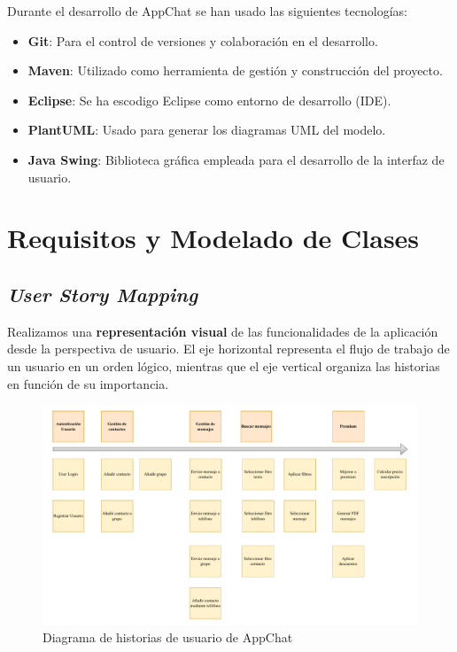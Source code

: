 \documentclass[11pt]{article}
\begin{document}
Durante el desarrollo de AppChat se han usado las siguientes tecnologías:

\begin{itemize}
	\item \textbf{Git}: Para el control de versiones y colaboración en el desarrollo.
	\item \textbf{Maven}: Utilizado como herramienta de gestión y construcción del proyecto.
	\item \textbf{Eclipse}: Se ha escodigo Eclipse como entorno de desarrollo (IDE).
	\item \textbf{PlantUML}: Usado para generar los diagramas UML del modelo.
	\item \textbf{Java Swing}: Biblioteca gráfica empleada para el desarrollo de la interfaz de usuario.
\end{itemize}

\clearpage

\section{Requisitos y Modelado de Clases}

\subsection{\textit{User Story Mapping}}

Realizamos una \textbf{representación visual} de las funcionalidades de la aplicación desde la perspectiva de usuario. El eje horizontal representa el flujo de trabajo de un usuario en un orden lógico, mientras que el eje vertical organiza las historias en función de su importancia.

\begin{figure}[h]
    \centering
    \includegraphics[width=\linewidth]{user-story-mapping.drawio-2.pdf}
    \caption{Diagrama de historias de usuario de AppChat}
    \label{fig:user-story-mapping}
\end{figure}
\end{document}
